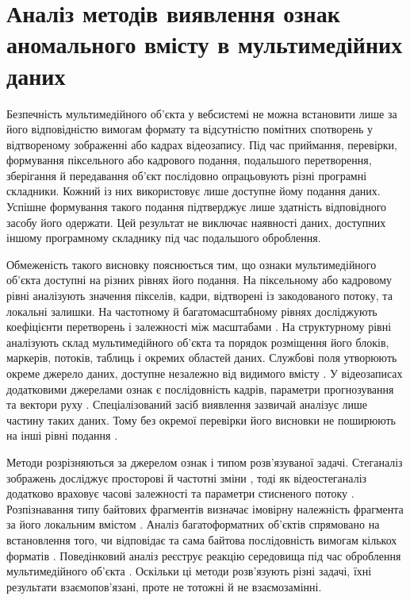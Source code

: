 \chapter{Аналіз методів виявлення ознак аномального вмісту в мультимедійних даних}
\label{chap:analysis}

Безпечність мультимедійного об’єкта у вебсистемі не можна встановити лише за його відповідністю вимогам формату та відсутністю помітних спотворень у відтвореному зображенні або кадрах відеозапису. Під час приймання, перевірки, формування піксельного або кадрового подання, подальшого перетворення, зберігання й передавання об’єкт послідовно опрацьовують різні програмні складники. Кожний із них використовує лише доступне йому подання даних. Успішне формування такого подання підтверджує лише здатність відповідного засобу його одержати. Цей результат не виключає наявності даних, доступних іншому програмному складнику під час подальшого оброблення.

Обмеженість такого висновку пояснюється тим, що ознаки мультимедійного об’єкта доступні на різних рівнях його подання. На піксельному або кадровому рівні аналізують значення пікселів, кадри, відтворені із закодованого потоку, та локальні залишки. На частотному й багатомасштабному рівнях досліджують коефіцієнти перетворень і залежності між масштабами \cite{kheddar2024review,apau2024review}. На структурному рівні аналізують склад мультимедійного об’єкта та порядок розміщення його блоків, маркерів, потоків, таблиць і окремих областей даних. Службові поля утворюють окреме джерело даних, доступне незалежно від видимого вмісту \cite{iptc2024metadata}. У відеозаписах додатковими джерелами ознак є послідовність кадрів, параметри прогнозування та вектори руху \cite{kheddar2024review,bouzegza2022video}. Спеціалізований засіб виявлення зазвичай аналізує лише частину таких даних. Тому без окремої перевірки його висновки не поширюють на інші рівні подання \cite{kheddar2024review,apau2024review}.

\enlargethispage{\baselineskip}
Методи розрізняються за джерелом ознак і типом розв’язуваної задачі. Стеганаліз зображень досліджує просторові й частотні зміни \cite{muralidharan2022race}, тоді як відеостеганаліз додатково враховує часові залежності та параметри стисненого потоку \cite{bouzegza2022video}. Розпізнавання типу байтових фрагментів визначає імовірну належність фрагмента за його локальним вмістом \cite{mittal2021fifty}. Аналіз багатоформатних об’єктів спрямовано на встановлення того, чи відповідає та сама байтова послідовність вимогам кількох форматів \cite{koch2022polyglot}. Поведінковий аналіз реєструє реакцію середовища під час оброблення мультимедійного об’єкта \cite{denysiuk2024behavior}. Оскільки ці методи розв’язують різні задачі, їхні результати взаємопов’язані, проте не тотожні й не взаємозамінні.

